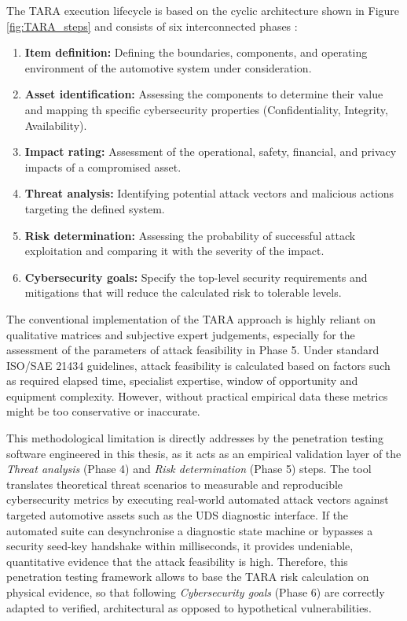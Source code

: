 The \gls{TARA} execution lifecycle is based on the cyclic architecture shown in Figure \ref{fig:TARA_steps} and consists of six interconnected phases \cite{rad2024understanding}:
\begin{enumerate}
    \item \textbf{Item definition:} Defining the boundaries, components, and operating environment of the automotive system under consideration.
    \item \textbf{Asset identification:} Assessing the components to determine their value and mapping th specific cybersecurity properties (Confidentiality, Integrity, Availability).
    \item \textbf{Impact rating:} Assessment of the operational, safety, financial, and privacy impacts of a compromised asset.
    \item \textbf{Threat analysis:} Identifying potential attack vectors and malicious actions targeting the defined system.
    \item \textbf{Risk determination:} Assessing the probability of successful attack exploitation and comparing it with the severity of the impact.
    \item \textbf{Cybersecurity goals:} Specify the top-level security requirements and mitigations that will reduce the calculated risk to tolerable levels.
\end{enumerate}

The conventional implementation of the \gls{TARA} approach is highly reliant on qualitative matrices and subjective expert judgements, especially for the assessment of the parameters of attack feasibility in Phase 5. Under standard ISO/SAE 21434 guidelines, attack feasibility is calculated based on factors such as required elapsed time, specialist expertise, window of opportunity and equipment complexity. However, without practical empirical data these metrics might be too conservative or inaccurate.

This methodological limitation is directly addresses by the penetration testing software engineered in this thesis, as it acts as an empirical validation layer of the \textit{Threat analysis} (Phase 4) and \textit{Risk determination} (Phase 5) steps. The tool translates theoretical threat scenarios to measurable and reproducible cybersecurity metrics by executing real-world automated attack vectors against targeted automotive assets such as the UDS diagnostic interface. If the automated suite can desynchronise a diagnostic state machine or bypasses a security seed-key handshake within milliseconds, it provides undeniable, quantitative evidence that the attack feasibility is high. Therefore, this penetration testing framework allows to base the TARA risk calculation on physical evidence, so that following \textit{Cybersecurity goals} (Phase 6) are correctly adapted to verified, architectural as opposed to hypothetical vulnerabilities.
